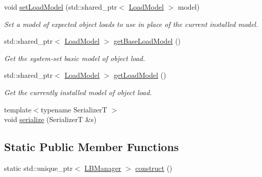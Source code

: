 \begin{DoxyCompactItemize}
void \hyperlink{structvt_1_1vrt_1_1collection_1_1balance_1_1_l_b_manager_a57813a70e0395907021a14c9e2bc1916}{set\+Load\+Model} (std\+::shared\+\_\+ptr$<$ \hyperlink{classvt_1_1vrt_1_1collection_1_1balance_1_1_load_model}{Load\+Model} $>$ model)
\begin{DoxyCompactList}\small\item\em Set a model of expected object loads to use in place of the current installed model. \end{DoxyCompactList}\item 
std\+::shared\+\_\+ptr$<$ \hyperlink{classvt_1_1vrt_1_1collection_1_1balance_1_1_load_model}{Load\+Model} $>$ \hyperlink{structvt_1_1vrt_1_1collection_1_1balance_1_1_l_b_manager_a9822187c2745a7b3b9c4a5929f8e3cc4}{get\+Base\+Load\+Model} ()
\begin{DoxyCompactList}\small\item\em Get the system-\/set basic model of object load. \end{DoxyCompactList}\item 
std\+::shared\+\_\+ptr$<$ \hyperlink{classvt_1_1vrt_1_1collection_1_1balance_1_1_load_model}{Load\+Model} $>$ \hyperlink{structvt_1_1vrt_1_1collection_1_1balance_1_1_l_b_manager_aaa442ee117e8c9c978c77275cb3e6404}{get\+Load\+Model} ()
\begin{DoxyCompactList}\small\item\em Get the currently installed model of object load. \end{DoxyCompactList}\item 
{\footnotesize template$<$typename SerializerT $>$ }\\void \hyperlink{structvt_1_1vrt_1_1collection_1_1balance_1_1_l_b_manager_a99b59530c0557d779760394e9ff2557f}{serialize} (SerializerT \&s)
\end{DoxyCompactItemize}
\subsection*{Static Public Member Functions}
\begin{DoxyCompactItemize}
\item 
static std\+::unique\+\_\+ptr$<$ \hyperlink{structvt_1_1vrt_1_1collection_1_1balance_1_1_l_b_manager}{L\+B\+Manager} $>$ \hyperlink{structvt_1_1vrt_1_1collection_1_1balance_1_1_l_b_manager_ae8e69a0540bb87b40ee86d2c1fe31cd5}{construct} ()
\end{DoxyCompactItemize}
